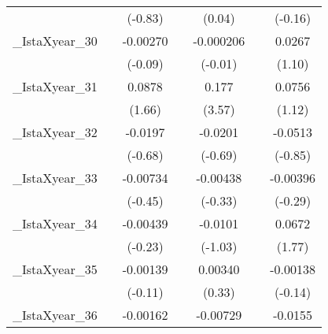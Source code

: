 {\begin{tabular}{l*{6}{c}}
            &                     &     (-0.83)         &                     &      (0.04)         &                     &     (-0.16)         \\
[1em]
\_IstaXyear\_30&                     &    -0.00270         &                     &   -0.000206         &                     &      0.0267         \\
            &                     &     (-0.09)         &                     &     (-0.01)         &                     &      (1.10)         \\
[1em]
\_IstaXyear\_31&                     &      0.0878         &                     &       0.177\sym{**} &                     &      0.0756         \\
            &                     &      (1.66)         &                     &      (3.57)         &                     &      (1.12)         \\
[1em]
\_IstaXyear\_32&                     &     -0.0197         &                     &     -0.0201         &                     &     -0.0513         \\
            &                     &     (-0.68)         &                     &     (-0.69)         &                     &     (-0.85)         \\
[1em]
\_IstaXyear\_33&                     &    -0.00734         &                     &    -0.00438         &                     &    -0.00396         \\
            &                     &     (-0.45)         &                     &     (-0.33)         &                     &     (-0.29)         \\
[1em]
\_IstaXyear\_34&                     &    -0.00439         &                     &     -0.0101         &                     &      0.0672         \\
            &                     &     (-0.23)         &                     &     (-1.03)         &                     &      (1.77)         \\
[1em]
\_IstaXyear\_35&                     &    -0.00139         &                     &     0.00340         &                     &    -0.00138         \\
            &                     &     (-0.11)         &                     &      (0.33)         &                     &     (-0.14)         \\
[1em]
\_IstaXyear\_36&                     &    -0.00162         &                     &    -0.00729         &                     &     -0.0155         \\

\end{tabular}}
